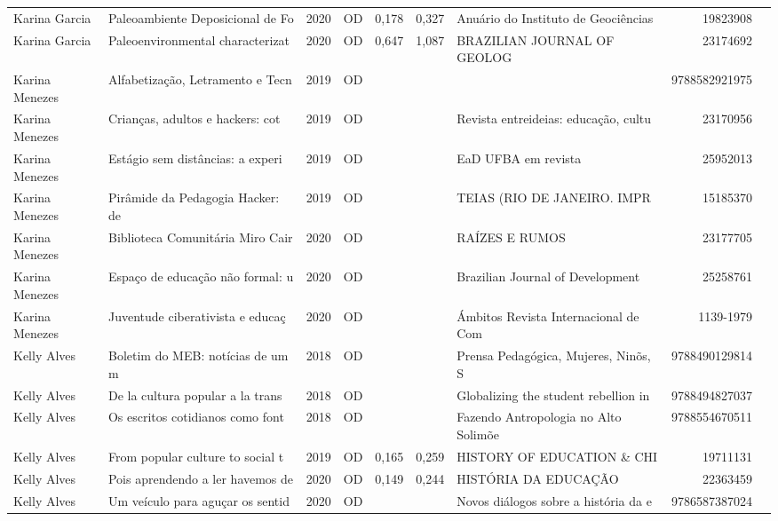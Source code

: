 \documentclass[12pt,brazil]{article}\usepackage[]{graphicx}\usepackage[]{xcolor}
\begin{document}
\begin{longtable}{lllrrllrr}
Karina Garcia & Paleoambiente Deposicional de Fo & 2020 & OD & 0,178 & 0,327 & Anuário do Instituto de Geociências  & 19823908 \\
\rowcolor{coautr}\rowcolor{coautr}\rowcolor{coautr}\rowcolor{coautr}\rowcolor{coautr}\rowcolor{coautr}\rowcolor{coautr}\rowcolor{coautr}\rowcolor{coautr}\rowcolor{coautr}\rowcolor{coautr}\rowcolor{coautr}\rowcolor{coautr}\rowcolor{coautr}\rowcolor{coautr}\rowcolor{coautr}Karina Garcia & Paleoenvironmental characterizat & 2020 & OD & 0,647 & 1,087 & BRAZILIAN JOURNAL OF GEOLOG & 23174692 \\
Karina Menezes & Alfabetização, Letramento e Tecn & 2019 & OD &  &  &  & 9788582921975 \\
Karina Menezes & Crianças, adultos e hackers: cot & 2019 & OD &  &  & Revista entreideias: educação, cultu & 23170956 \\
Karina Menezes & Estágio sem distâncias: a experi & 2019 & OD &  &  & EaD UFBA em revista & 25952013 \\
Karina Menezes & Pirâmide da Pedagogia Hacker: de & 2019 & OD &  &  & TEIAS (RIO DE JANEIRO. IMPR & 15185370 \\
Karina Menezes & Biblioteca Comunitária Miro Cair & 2020 & OD &  &  & RAÍZES E RUMOS & 23177705 \\
Karina Menezes & Espaço de educação não formal: u & 2020 & OD &  &  & Brazilian Journal of Development & 25258761 \\
Karina Menezes & Juventude ciberativista e educaç & 2020 & OD &  &  & Ámbitos Revista Internacional de Com & 1139-1979 \\
Kelly Alves & Boletim do MEB: notícias de um m & 2018 & OD &  &  & Prensa Pedagógica, Mujeres, Ninõs, S & 9788490129814 \\
Kelly Alves & De la cultura popular a la trans & 2018 & OD &  &  & Globalizing the student rebellion in & 9788494827037 \\
Kelly Alves & Os escritos cotidianos como font & 2018 & OD &  &  & Fazendo Antropologia no Alto Solimõe & 9788554670511 \\
Kelly Alves & From popular culture to social t & 2019 & OD & 0,165 & 0,259 & HISTORY OF EDUCATION \& CHI & 19711131 \\
Kelly Alves & Pois aprendendo a ler havemos de & 2020 & OD & 0,149 & 0,244 & HISTÓRIA DA EDUCAÇÃO & 22363459 \\
Kelly Alves & Um veículo para aguçar os sentid & 2020 & OD &  &  & Novos diálogos sobre a história da e & 9786587387024 \\

\end{longtable}
\end{document}
